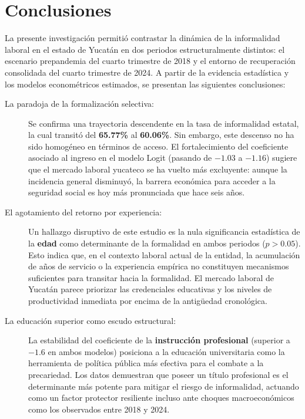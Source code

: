 \section{Conclusiones}

La presente investigación permitió contrastar la dinámica de la informalidad laboral en el estado de Yucatán en dos periodos estructuralmente distintos: el escenario prepandemia del cuarto trimestre de 2018 y el entorno de recuperación consolidada del cuarto trimestre de 2024. A partir de la evidencia estadística y los modelos econométricos estimados, se presentan las siguientes conclusiones:

\begin{description}
    \item[La paradoja de la formalización selectiva:] Se confirma una trayectoria descendente en la tasa de informalidad estatal, la cual transitó del \textbf{65.77\%} al \textbf{60.06\%}. Sin embargo, este descenso no ha sido homogéneo en términos de acceso. El fortalecimiento del coeficiente asociado al ingreso en el modelo Logit (pasando de $-1.03$ a $-1.16$) sugiere que el mercado laboral yucateco se ha vuelto más excluyente: aunque la incidencia general disminuyó, la barrera económica para acceder a la seguridad social es hoy más pronunciada que hace seis años.
    
    \item[El agotamiento del retorno por experiencia:] Un hallazgo disruptivo de este estudio es la nula significancia estadística de la \textbf{edad} como determinante de la formalidad en ambos periodos ($p > 0.05$). Esto indica que, en el contexto laboral actual de la entidad, la acumulación de años de servicio o la experiencia empírica no constituyen mecanismos suficientes para transitar hacia la formalidad. El mercado laboral de Yucatán parece priorizar las credenciales educativas y los niveles de productividad inmediata por encima de la antigüedad cronológica.
    
    \item[La educación superior como escudo estructural:] La estabilidad del coeficiente de la \textbf{instrucción profesional} (superior a $-1.6$ en ambos modelos) posiciona a la educación universitaria como la herramienta de política pública más efectiva para el combate a la precariedad. Los datos demuestran que poseer un título profesional es el determinante más potente para mitigar el riesgo de informalidad, actuando como un factor protector resiliente incluso ante choques macroeconómicos como los observados entre 2018 y 2024.
    

\end{description}
